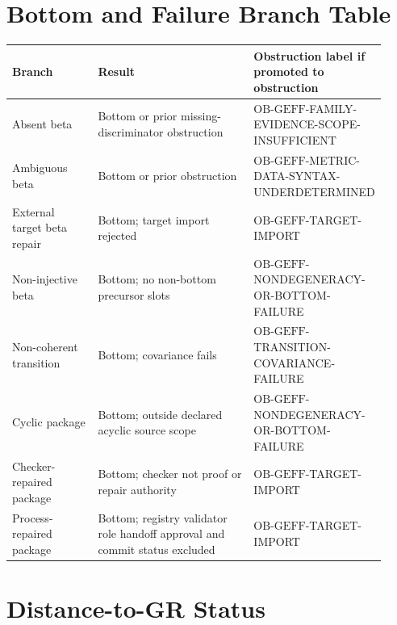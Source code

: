\documentclass[11pt]{article}
\newcommand{\OBGEFF}{\mathrm{OB\mbox{-}GEFF}}
\begin{document}
\section{Bottom and Failure Branch Table}

\begin{longtable}{p{0.25\linewidth}p{0.50\linewidth}p{0.17\linewidth}}
\toprule
Branch & Result & Obstruction label if promoted to obstruction \\
\midrule
Absent beta & Bottom or prior missing-discriminator obstruction & \(\OBGEFF\)-FAMILY-EVIDENCE-SCOPE-INSUFFICIENT \\
Ambiguous beta & Bottom or prior obstruction & \(\OBGEFF\)-METRIC-DATA-SYNTAX-UNDERDETERMINED \\
External target beta repair & Bottom; target import rejected & \(\OBGEFF\)-TARGET-IMPORT \\
Non-injective beta & Bottom; no non-bottom precursor slots & \(\OBGEFF\)-NONDEGENERACY-OR-BOTTOM-FAILURE \\
Non-coherent transition & Bottom; covariance fails & \(\OBGEFF\)-TRANSITION-COVARIANCE-FAILURE \\
Cyclic package & Bottom; outside declared acyclic source scope & \(\OBGEFF\)-NONDEGENERACY-OR-BOTTOM-FAILURE \\
Checker-repaired package & Bottom; checker not proof or repair authority & \(\OBGEFF\)-TARGET-IMPORT \\
Process-repaired package & Bottom; registry validator role handoff approval and commit status excluded & \(\OBGEFF\)-TARGET-IMPORT \\
\bottomrule
\end{longtable}

\section{Distance-to-GR Status}
\end{document}

